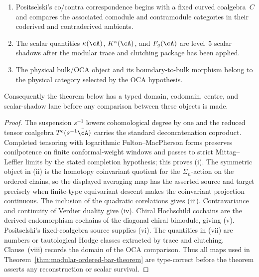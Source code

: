 \begin{lemma}
\begin{enumerate}[label=\textup{(\roman*)}]
\[ =
\ChirHoch^\bullet(\cA,\cA)
\]
is the level~3 derived chiral centre, namely a chiral Hochschild
cochain object.
\item Positselski's co/contra correspondence begins with a fixed
curved coalgebra~\(C\) and compares the associated comodule and
contramodule categories in their coderived and contraderived ambients.
\item The scalar quantities \(\kappa(\cA)\), \(K^\kappa(\cA)\), and
\(F_g(\cA)\) are level~5 scalar shadows after the modular trace
and clutching package has been applied.
\item The physical bulk/OCA object and its boundary-to-bulk morphism
belong to the physical category selected by the OCA hypothesis.
\end{enumerate}
Consequently the theorem below has a typed domain, codomain, centre,
and scalar-shadow lane before any comparison between these objects is
made.
\end{lemma}

\begin{proof}
The suspension \(s^{-1}\) lowers cohomological degree by one and the
reduced tensor coalgebra \(T^c(s^{-1}\bar\cA)\) carries the standard
deconcatenation coproduct.  Completed tensoring with logarithmic
Fulton--MacPherson forms preserves conilpotence on finite
conformal-weight windows and passes to strict Mittag--Leffler limits by
the stated completion hypothesis; this proves \textup{(i)}.  The
symmetric object in \textup{(ii)} is the homotopy coinvariant quotient
for the \(\Sigma_n\)-action on the ordered chains, so the displayed
averaging map has the asserted source and target precisely when
finite-type equivariant descent makes the coinvariant projection
continuous.  The inclusion of the quadratic corelations gives
\textup{(iii)}.  Contravariance and continuity of Verdier duality give
\textup{(iv)}.  Chiral Hochschild cochains are the derived endomorphism
cochains of the diagonal chiral bimodule, giving \textup{(v)}.
Positselski's fixed-coalgebra source supplies \textup{(vi)}.  The
quantities in \textup{(vii)} are numbers or tautological Hodge classes
extracted by trace and clutching.  Clause~\textup{(viii)} records the
domain of the OCA comparison.  Thus all maps used in
Theorem~\ref{thm:modular-ordered-bar-theorem} are type-correct before
the theorem asserts any reconstruction or scalar survival.
\end{proof}

